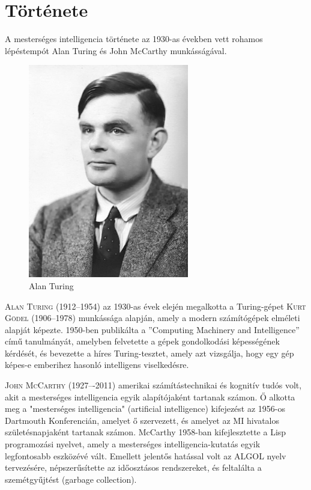 \documentclass[
]{thesis-ekf}
\theoremstyle{definition}
\theoremstyle{remark}
\begin{document}
\section{Története}

A mesterséges intelligencia története az 1930-as években vett rohamos lépéstempót Alan Turing és John McCarthy munkásságával.

\begin{figure}[h!]
	\centering
	\includegraphics[width=7cm]{./pictures/Alan_Turing.jpg}
	\caption{Alan Turing}
	\label{Turing}
\end{figure} 

\textsc{Alan Turing} (1912--1954) az 1930-as évek elején megalkotta a Turing-gépet \textsc{Kurt Gödel} (1906--1978) munkássága alapján, amely a modern számítógépek elméleti alapját képezte. 1950-ben publikálta a ''Computing Machinery and Intelligence'' című tanulmányát, amelyben felvetette a gépek gondolkodási képességének kérdését, és bevezette a híres Turing-tesztet, amely azt vizsgálja, hogy egy gép képes-e emberihez hasonló intelligens viselkedésre. \cite{AlanTuring,CMI}

\textsc{John McCarthy} (1927–-2011) amerikai számítástechnikai és kognitív tudós volt, akit a mesterséges intelligencia egyik alapítójaként tartanak számon. Ő alkotta meg a "mesterséges intelligencia" (artificial intelligence) kifejezést az 1956-os Dartmouth Konferencián, amelyet ő szervezett, és amelyet az MI hivatalos születésnapjaként tartanak számon. McCarthy 1958-ban kifejlesztette a Lisp programozási nyelvet, amely a mesterséges intelligencia-kutatás egyik legfontosabb eszközévé vált. Emellett jelentős hatással volt az ALGOL nyelv tervezésére, népszerűsítette az időosztásos rendszereket, és feltalálta a szemétgyűjtést (garbage collection). 
\end{document}
